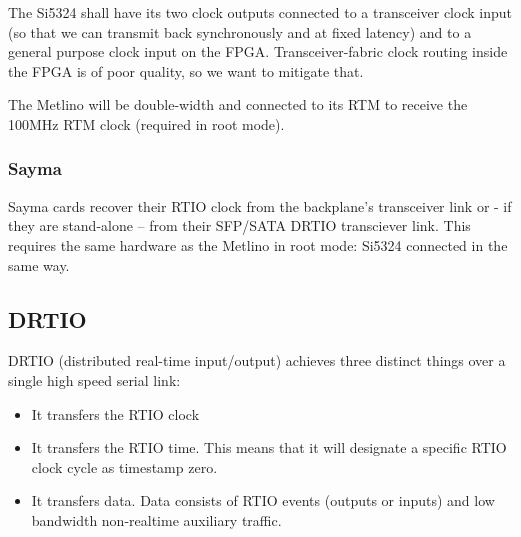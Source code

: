 The Si5324 shall have its two clock outputs connected to a transceiver
clock input (so that we can transmit back synchronously and at fixed
latency) and to a general purpose clock input on the FPGA.
Transceiver-fabric clock routing inside the FPGA is of poor quality, so
we want to mitigate that.

The Metlino will be double-width and connected to its RTM to receive the
100MHz RTM clock (required in root mode).

\subsubsection{Sayma}\label{sayma}

Sayma cards recover their RTIO clock from the backplane's transceiver
link or - if they are stand-alone -- from their SFP/SATA DRTIO
transciever link. This requires the same hardware as the Metlino in root
mode: Si5324 connected in the same way.

\subsection{DRTIO}\label{drtio}

DRTIO (distributed real-time input/output) achieves three distinct
things over a single high speed serial link:

\begin{itemize}

	\item
	It transfers the RTIO clock
	\item
	It transfers the RTIO time. This means that it will designate a
	specific RTIO clock cycle as timestamp zero.
	\item
	It transfers data. Data consists of RTIO events (outputs or inputs)
	and low bandwidth non-realtime auxiliary traffic.
\end{itemize}



